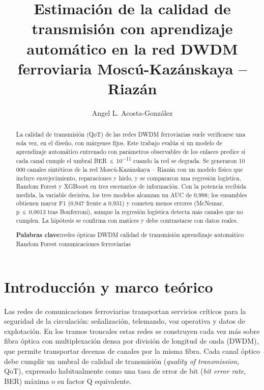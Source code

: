 \documentclass[runningheads]{llncs}
\def\keywordname{\textbf{Palabras clave:}}
\newcommand{\keywords}[1]{\par\addvspace\baselineskip\noindent\keywordname\enspace\ignorespaces#1}
\begin{document}
\mainmatter

\title{Estimación de la calidad de transmisión con aprendizaje automático en la red DWDM ferroviaria Moscú-Kazánskaya – Riazán}
\author{Angel L. Acosta-González}
\maketitle

\begin{abstract}
La calidad de transmisión (QoT) de las redes DWDM ferroviarias suele verificarse una sola vez, en el diseño, con márgenes fijos. Este trabajo evalúa si un modelo de aprendizaje automático entrenado con parámetros observables de los enlaces predice si cada canal cumple el umbral BER~≤~10\textsuperscript{−11} cuando la red se degrada. Se generaron 10 000 canales sintéticos de la red Moscú-Kazánskaya – Riazán con un modelo físico que incluye envejecimiento, reparaciones y hielo, y se compararon una regresión logística, Random Forest y XGBoost en tres escenarios de información. Con la potencia recibida medida, la variable decisiva, los tres modelos alcanzan un AUC de 0,998; los ensambles obtienen mayor F1 (0,947 frente a 0,931) y cometen menos errores (McNemar, p~≤~0,0013 tras Bonferroni), aunque la regresión logística detecta más canales que no cumplen. La hipótesis se confirma con matices y debe contrastarse con datos reales.
\keywords{redes ópticas DWDM \textperiodcentered{} calidad de transmisión \textperiodcentered{} aprendizaje automático \textperiodcentered{} Random Forest \textperiodcentered{} comunicaciones ferroviarias}
\end{abstract}


\section{Introducción y marco teórico}\label{sec:1}

Las redes de comunicaciones ferroviarias transportan servicios críticos para la seguridad de la circulación: señalización, telemando, voz operativa y datos de explotación. En los tramos troncales estas redes se construyen cada vez más sobre fibra óptica con multiplexación densa por división de longitud de onda (DWDM), que permite transportar decenas de canales por la misma fibra. Cada canal óptico debe cumplir un umbral de calidad de transmisión (\emph{quality of transmission}, QoT), expresado habitualmente como una tasa de error de bit (\emph{bit error rate}, BER) máxima o su factor Q equivalente.
\end{document}
